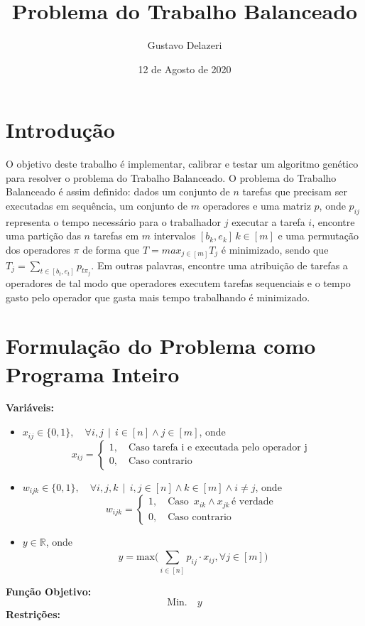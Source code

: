 \documentclass{article}
\title{Problema do Trabalho Balanceado}
\author{Gustavo Delazeri}
\date{12 de Agosto de 2020}
\begin{document}
\maketitle

\section{Introdução}
\quad O objetivo deste trabalho é implementar, calibrar e testar um algoritmo genético para resolver o problema do Trabalho Balanceado. 
O problema do Trabalho Balanceado é assim definido: dados um conjunto de $n$ tarefas que precisam ser executadas em sequência, um conjunto de $m$ operadores e uma matriz $p$, onde $p_{ij}$ representa o tempo necessário para o trabalhador $j$ executar a tarefa $i$, encontre  uma partição das $n$ tarefas em $m$ intervalos $[b_{k}, e_{k}] \, k \in [m] $ e uma permutação dos
operadores $\pi$ de forma que  $T =  max_{j \in [m]} T_{j}$ é minimizado, sendo que $T_{j} = \sum_{t \in [b_{t}, e_{t}]}{} p_{t\pi_{j}} $. Em outras palavras, encontre uma atribuição de tarefas a operadores de tal modo que operadores executem tarefas sequenciais e o tempo gasto pelo operador que gasta mais tempo trabalhando é minimizado. 
\section{Formulação do Problema como Programa Inteiro}
\textbf{Variáveis:} 
\begin{itemize}
  \item $x_{ij} \in \{0, 1\}, \quad \forall i,j  \, \mid  \, i \in [n] \land j \in [m]$, onde
  	$$x_{ij} = 
	\begin{cases}
	1,  \quad  \text{Caso tarefa i e executada pelo operador j } \\
	0,  \quad  \text{Caso contrario}
	\end{cases}
	$$
  \item $w_{ijk} \in \{0, 1\}, \quad \forall i,j,k  \, \mid \,  i,j \in [n]  \land k \in [m] \land i \neq j$, onde
  	$$w_{ijk} = 
	\begin{cases}
	1,  \quad  \text{Caso } \,  x_{ik} \land x_{jk} \, \text{é verdade }\\
	0,  \quad  \text{Caso contrario}
	\end{cases}
	$$
	
  \item $y \in \mathbb{R}$, onde
  	$$y = \text{max}\Bigg(\sum_{i \in [n] }^{} p_{ij} \cdot x_{ij},   \forall j \in [m] \Bigg)	$$
\end{itemize}
\textbf{Função Objetivo:} 
	$$\text{Min.} \quad y$$
\textbf{Restrições:} 
\end{document}
